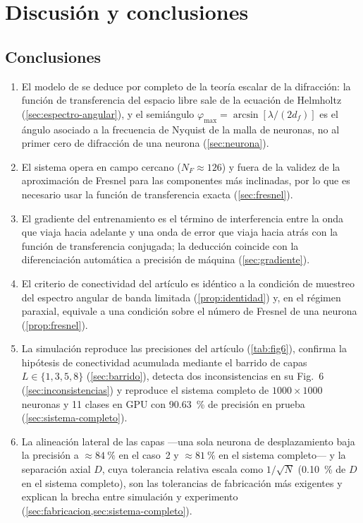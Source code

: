 \chapter{Discusión y conclusiones}\label{cap:conclusiones}

\section{Conclusiones}

\begin{enumerate}
  \item El modelo de \textcite{chen2021} se deduce por completo de la teoría escalar de la
  difracción: la función de transferencia del espacio libre sale de la ecuación de Helmholtz
  (\cref{sec:espectro-angular}), y el semiángulo $\varphi_{\max}=\arcsin[\lambda/(2d_f)]$ es el
  ángulo asociado a la frecuencia de Nyquist de la malla de neuronas, no al primer cero de
  difracción de una neurona (\cref{sec:neurona}).
  \item El sistema opera en campo cercano ($N_F\approx126$) y fuera de la validez de la
  aproximación de Fresnel para las componentes más inclinadas, por lo que es necesario usar
  la función de transferencia exacta (\cref{sec:fresnel}).
  \item El gradiente del entrenamiento es el término de interferencia entre la onda que viaja
  hacia adelante y una onda de error que viaja hacia atrás con la función de transferencia
  conjugada; la deducción coincide con la diferenciación automática a precisión de máquina
  (\cref{sec:gradiente}).
  \item El criterio de conectividad del artículo es idéntico a la condición de muestreo del
  espectro angular de banda limitada (\cref{prop:identidad}) y, en el régimen paraxial,
  equivale a una condición sobre el número de Fresnel de una neurona (\cref{prop:fresnel}).
  \item La simulación reproduce las precisiones del artículo (\cref{tab:fig6}), confirma la
  hipótesis de conectividad acumulada mediante el barrido de capas $L\in\{1,3,5,8\}$
  (\cref{sec:barrido}), detecta dos inconsistencias en su Fig.~6 (\cref{sec:inconsistencias}) y
  reproduce el sistema completo de $1000\times1000$ neuronas y 11 clases en GPU con
  \SI{90.63}{\percent} de precisión en prueba (\cref{sec:sistema-completo}).
  \item La alineación lateral de las capas —una sola neurona de desplazamiento baja la precisión a
  $\approx\SI{84}{\percent}$ en el caso~2 y $\approx\SI{81}{\percent}$ en el sistema completo— y
  la separación axial $D$, cuya tolerancia relativa escala como $1/\sqrt N$ (\SI{0.10}{\percent}
  de $D$ en el sistema completo), son las tolerancias de fabricación más exigentes y explican la
  brecha entre simulación y experimento (\cref{sec:fabricacion,sec:sistema-completo}).
\end{enumerate}

